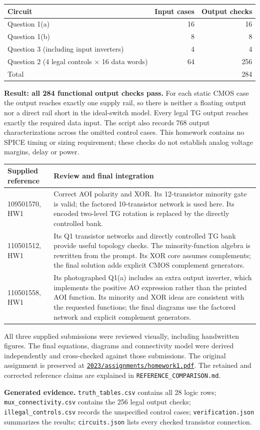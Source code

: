 \documentclass[11pt,a4paper]{article}
\begin{document}
\begin{center}
\begin{tabular}{lrr}\toprule
Circuit&Input cases&Output checks\\\midrule
Question 1(a)&16&16\\
Question 1(b)&8&8\\
Question 3 (including input inverters)&4&4\\
Question 2 (4 legal controls $\times$ 16 data words)&64&256\\\midrule
Total&&284\\\bottomrule
\end{tabular}
\end{center}
\textbf{Result: all 284 functional output checks pass.} For each static CMOS
case the output reaches exactly one supply rail, so there is neither a floating
output nor a direct rail short in the ideal-switch model. Every legal TG output
reaches exactly the required data input. The script also records 768 output
characterizations across the omitted control cases. This homework contains no
SPICE timing or sizing requirement; these checks do not establish analog
voltage margins, delay or power.

\begin{center}
\begin{tabular}{p{.21\linewidth}p{.70\linewidth}}\toprule
Supplied reference&Review and final integration\\\midrule
109501570, HW1&Correct AOI polarity and XOR. Its 12-transistor minority
gate is valid; the factored 10-transistor network is used here. Its encoded
two-level TG rotation is replaced by the directly controlled bank.\\[4pt]
110501512, HW1&Its Q1 transistor networks and directly controlled TG bank
provide useful topology checks. The minority-function algebra is rewritten
from the prompt. Its XOR core assumes complements; the final solution adds
explicit CMOS complement generators.\\[4pt]
110501558, HW1&Its photographed Q1(a) includes an extra output inverter,
which implements the positive AO expression rather than the printed AOI
function. Its minority and XOR ideas are consistent with the requested
functions; the final diagrams use the factored network and explicit
complement generators.\\\bottomrule
\end{tabular}
\end{center}
All three supplied submissions were reviewed visually, including handwritten
figures. The final equations, diagrams and connectivity model were derived
independently and cross-checked against those submissions. The original
assignment is preserved at
\href{../assignments/homework1.pdf}{\texttt{2023/assignments/homework1.pdf}}.
The retained and corrected reference claims are explained in
\texttt{REFERENCE\_COMPARISON.md}.

\textbf{Generated evidence.} \texttt{truth\_tables.csv} contains all 28 logic
rows; \texttt{mux\_connectivity.csv} contains the 256 legal output checks;
\texttt{illegal\_controls.csv} records the unspecified control cases;
\texttt{verification.json} summarizes the results;
\texttt{circuits.json} lists every checked transistor connection.
\end{document}
